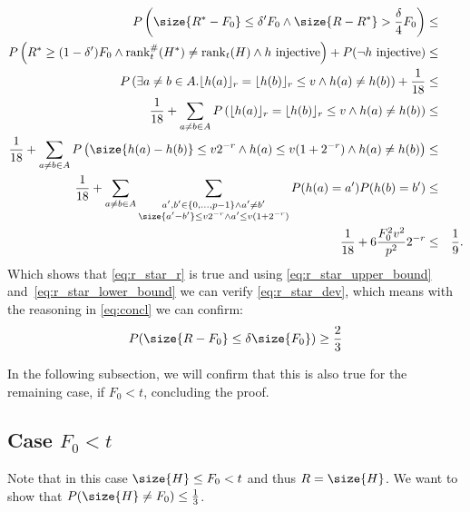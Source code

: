 \documentclass[11pt,a4paper]{article}
\begin{document}
\begin{eqnarray*}
    P\left( \size{R^*-F_0} \leq \delta' F_0 \wedge \size{R-R^*} > \frac{\delta}{4} F_0 \right) & \leq & \\
    P\left( R^* \geq (1-\delta') F_0 \wedge \mathrm{rank}_t^{\#}(H^*) \neq \mathrm{rank}_t(H) \wedge h \textrm{ injective}\right) + P(\neg h \textrm{ injective}) & \leq & \\
    P\left( \exists a \neq b \in A. \lfloor h(a) \rfloor_r = \lfloor h(b) \rfloor_r \leq v \wedge h(a) \neq h(b) \right) + \frac{1}{18} & \leq & \\
    \frac{1}{18} + \sum_{a \neq b \in A} P\left(\lfloor h(a) \rfloor_r = \lfloor h(b) \rfloor_r \leq v \wedge h(a) \neq h(b) \right) & \leq & \\
    \frac{1}{18} + \sum_{a \neq b \in A} P\left(\size{h(a) - h(b)} \leq v 2^{-r} \wedge h(a) \leq v (1+2^{-r}) \wedge h(a) \neq h(b) \right) & \leq & \\
    \frac{1}{18} + \sum_{a \neq b \in A} \sum_{\substack{a', b' \in \{0,\ldots, p-1\} \wedge a' \neq b' \\ \size{a'-b'} \leq v 2^{-r} \wedge a' \leq v (1+2^{-r})}} P(h(a) = a') P(h(b)= b') & \leq & \\
    \frac{1}{18} + 6 \frac{F_0^2 v^2}{p^2} 2^{-r} & \leq & \frac{1}{9} \textrm{.}
\end{eqnarray*}
Which shows that \autoref{eq:r_star_r} is true and using \autoref{eq:r_star_upper_bound} and~\ref{eq:r_star_lower_bound} we can verify 
\autoref{eq:r_star_dev}, which means with the reasoning in \autoref{eq:concl} we can confirm:
\begin{equation}
    P(\size{R - F_0} \leq \delta \size{F_0}) \geq \frac{2}{3}
\end{equation}

In the following subsection, we will confirm that this is also true for the remaining case, if $F_0 < t$, concluding the proof.
\subsection{Case $F_0 < t$}
Note that in this case $\size{H} \leq F_0 < t$ and thus $R = \size{H}$. We want to show that
$P(\size{H} \neq F_0) \leq \frac{1}{3}$.
\end{document}
